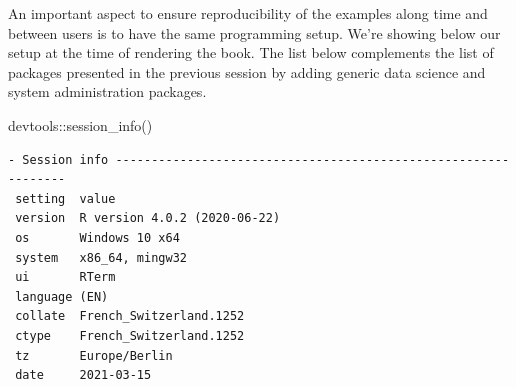 \documentclass[
]{book}
\newenvironment{Shaded}{\begin{snugshade}}{\end{snugshade}}
\newcommand{\FunctionTok}[1]{\textcolor[rgb]{0.00,0.00,0.00}{#1}}
\newcommand{\NormalTok}[1]{#1}
\newcommand{\SpecialCharTok}[1]{\textcolor[rgb]{0.00,0.00,0.00}{#1}}
\begin{document}
An important aspect to ensure reproducibility of the examples along time and between users is to have the same programming setup. We're showing below our setup at the time of rendering the book. The list below complements the list of packages presented in the previous session by adding generic data science and system administration packages.

\begin{Shaded}
\begin{Highlighting}[]
\NormalTok{devtools}\SpecialCharTok{::}\FunctionTok{session\_info}\NormalTok{()}
\end{Highlighting}
\end{Shaded}

\begin{verbatim}
- Session info ---------------------------------------------------------------
 setting  value                       
 version  R version 4.0.2 (2020-06-22)
 os       Windows 10 x64              
 system   x86_64, mingw32             
 ui       RTerm                       
 language (EN)                        
 collate  French_Switzerland.1252     
 ctype    French_Switzerland.1252     
 tz       Europe/Berlin               
 date     2021-03-15                  


\end{verbatim}
\end{document}

